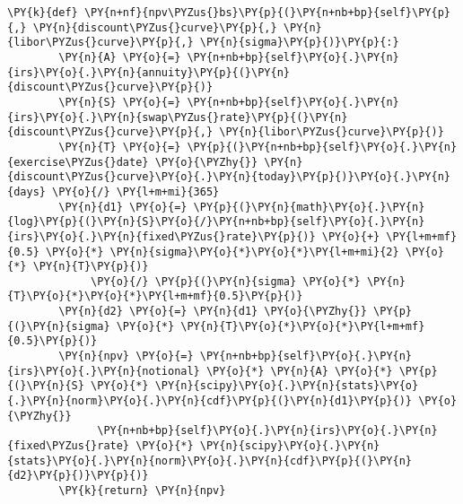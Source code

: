 \begin{Answer}
\begin{tcolorbox}[size=fbox, boxrule=1pt, colback=cellbackground, colframe=cellborder]
\begin{Verbatim}[commandchars=\\\{\}]
    \PY{k}{def} \PY{n+nf}{npv\PYZus{}bs}\PY{p}{(}\PY{n+nb+bp}{self}\PY{p}{,} \PY{n}{discount\PYZus{}curve}\PY{p}{,} \PY{n}{libor\PYZus{}curve}\PY{p}{,} \PY{n}{sigma}\PY{p}{)}\PY{p}{:}
        \PY{n}{A} \PY{o}{=} \PY{n+nb+bp}{self}\PY{o}{.}\PY{n}{irs}\PY{o}{.}\PY{n}{annuity}\PY{p}{(}\PY{n}{discount\PYZus{}curve}\PY{p}{)}
        \PY{n}{S} \PY{o}{=} \PY{n+nb+bp}{self}\PY{o}{.}\PY{n}{irs}\PY{o}{.}\PY{n}{swap\PYZus{}rate}\PY{p}{(}\PY{n}{discount\PYZus{}curve}\PY{p}{,} \PY{n}{libor\PYZus{}curve}\PY{p}{)}
        \PY{n}{T} \PY{o}{=} \PY{p}{(}\PY{n+nb+bp}{self}\PY{o}{.}\PY{n}{exercise\PYZus{}date} \PY{o}{\PYZhy{}} \PY{n}{discount\PYZus{}curve}\PY{o}{.}\PY{n}{today}\PY{p}{)}\PY{o}{.}\PY{n}{days} \PY{o}{/} \PY{l+m+mi}{365}
        \PY{n}{d1} \PY{o}{=} \PY{p}{(}\PY{n}{math}\PY{o}{.}\PY{n}{log}\PY{p}{(}\PY{n}{S}\PY{o}{/}\PY{n+nb+bp}{self}\PY{o}{.}\PY{n}{irs}\PY{o}{.}\PY{n}{fixed\PYZus{}rate}\PY{p}{)} \PY{o}{+} \PY{l+m+mf}{0.5} \PY{o}{*} \PY{n}{sigma}\PY{o}{*}\PY{o}{*}\PY{l+m+mi}{2} \PY{o}{*} \PY{n}{T}\PY{p}{)} 
             \PY{o}{/} \PY{p}{(}\PY{n}{sigma} \PY{o}{*} \PY{n}{T}\PY{o}{*}\PY{o}{*}\PY{l+m+mf}{0.5}\PY{p}{)}
        \PY{n}{d2} \PY{o}{=} \PY{n}{d1} \PY{o}{\PYZhy{}} \PY{p}{(}\PY{n}{sigma} \PY{o}{*} \PY{n}{T}\PY{o}{*}\PY{o}{*}\PY{l+m+mf}{0.5}\PY{p}{)}
        \PY{n}{npv} \PY{o}{=} \PY{n+nb+bp}{self}\PY{o}{.}\PY{n}{irs}\PY{o}{.}\PY{n}{notional} \PY{o}{*} \PY{n}{A} \PY{o}{*} \PY{p}{(}\PY{n}{S} \PY{o}{*} \PY{n}{scipy}\PY{o}{.}\PY{n}{stats}\PY{o}{.}\PY{n}{norm}\PY{o}{.}\PY{n}{cdf}\PY{p}{(}\PY{n}{d1}\PY{p}{)} \PY{o}{\PYZhy{}} 
              \PY{n+nb+bp}{self}\PY{o}{.}\PY{n}{irs}\PY{o}{.}\PY{n}{fixed\PYZus{}rate} \PY{o}{*} \PY{n}{scipy}\PY{o}{.}\PY{n}{stats}\PY{o}{.}\PY{n}{norm}\PY{o}{.}\PY{n}{cdf}\PY{p}{(}\PY{n}{d2}\PY{p}{)}\PY{p}{)}
        \PY{k}{return} \PY{n}{npv}
\end{Verbatim}
\end{tcolorbox}
\begin{tcolorbox}[size=fbox, boxrule=1pt, colback=cellbackground, colframe=cellborder]
\begin{Verbatim}[commandchars=\\\{\}]
    

\end{Verbatim}
\end{tcolorbox}
\end{Answer}
